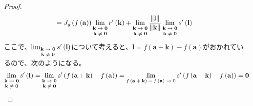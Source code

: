 \documentclass[dvipdfmx]{jsarticle}
\begin{document}
\begin{proof}
\begin{align*}
&= J_{g}\left( f\left( \mathbf{a} \right) \right)\lim_{\scriptsize \begin{matrix}
\mathbf{k} \rightarrow \mathbf{0} \\
\mathbf{k} \neq \mathbf{0} \\
\end{matrix}}{r'\left( \mathbf{k} \right)} + \lim_{\scriptsize \begin{matrix}
\mathbf{k} \rightarrow \mathbf{0} \\
\mathbf{k} \neq \mathbf{0} \\
\end{matrix}}\frac{\left\| \mathbf{l} \right\|}{\left\| \mathbf{k} \right\|}\lim_{\scriptsize \begin{matrix}
\mathbf{k} \rightarrow \mathbf{0} \\
\mathbf{k} \neq \mathbf{0} \\
\end{matrix}}{s'\left( \mathbf{l} \right)}
\end{align*}
ここで、$\lim_{\scriptsize \begin{matrix}
\mathbf{k} \rightarrow \mathbf{0} \\
\mathbf{k} \neq \mathbf{0} \\
\end{matrix}}{s'\left( \mathbf{l} \right)}$について考えると、$\mathbf{l} = f\left( \mathbf{a} + \mathbf{k} \right) - f\left( \mathbf{a} \right)$がおかれているので、次のようになる。
\begin{align*}
\lim_{\scriptsize \begin{matrix}
\mathbf{k} \rightarrow \mathbf{0} \\
\mathbf{k} \neq \mathbf{0} \\
\end{matrix}}{s'\left( \mathbf{l} \right)} = \lim_{\scriptsize \begin{matrix}
\mathbf{k} \rightarrow \mathbf{0} \\
\mathbf{k} \neq \mathbf{0} \\
\end{matrix}}{s'\left( f\left( \mathbf{a} + \mathbf{k} \right) - f\left( \mathbf{a} \right) \right)} = \lim_{\scriptsize \begin{matrix}
f\left( \mathbf{a} + \mathbf{k} \right) - f\left( \mathbf{a} \right) \rightarrow 0 \\
\end{matrix}}{s'\left( f\left( \mathbf{a} + \mathbf{k} \right) - f\left( \mathbf{a} \right) \right)} = \mathbf{0}
\end{align*}

\end{proof}
\end{document}
